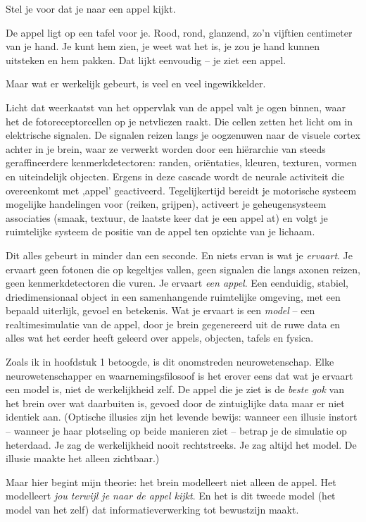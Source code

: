 \documentclass[11pt, twoside, openright]{book}
\begin{document}
Stel je voor dat je naar een appel kijkt.

De appel ligt op een tafel voor je. Rood, rond, glanzend, zo'n vijftien centimeter van je hand. Je kunt hem zien, je weet wat het is, je zou je hand kunnen uitsteken en hem pakken. Dat lijkt eenvoudig -- je ziet een appel.

Maar wat er werkelijk gebeurt, is veel en veel ingewikkelder.

Licht dat weerkaatst van het oppervlak van de appel valt je ogen binnen, waar het de fotoreceptorcellen op je netvliezen raakt. Die cellen zetten het licht om in elektrische signalen. De signalen reizen langs je oogzenuwen naar de visuele cortex achter in je brein, waar ze verwerkt worden door een hiërarchie van steeds geraffineerdere kenmerkdetectoren: randen, oriëntaties, kleuren, texturen, vormen en uiteindelijk objecten. Ergens in deze cascade wordt de neurale activiteit die overeenkomt met ‚appel' geactiveerd. Tegelijkertijd bereidt je motorische systeem mogelijke handelingen voor (reiken, grijpen), activeert je geheugensysteem associaties (smaak, textuur, de laatste keer dat je een appel at) en volgt je ruimtelijke systeem de positie van de appel ten opzichte van je lichaam.

Dit alles gebeurt in minder dan een seconde. En niets ervan is wat je \textit{ervaart}. Je ervaart geen fotonen die op kegeltjes vallen, geen signalen die langs axonen reizen, geen kenmerkdetectoren die vuren. Je ervaart \textit{een appel}. Een eenduidig, stabiel, driedimensionaal object in een samenhangende ruimtelijke omgeving, met een bepaald uiterlijk, gevoel en betekenis. Wat je ervaart is een \textit{model} -- een realtimesimulatie van de appel, door je brein gegenereerd uit de ruwe data en alles wat het eerder heeft geleerd over appels, objecten, tafels en fysica.

Zoals ik in hoofdstuk 1 betoogde, is dit onomstreden neurowetenschap. Elke neurowetenschapper en waarnemingsfilosoof is het erover eens dat wat je ervaart een model is, niet de werkelijkheid zelf. De appel die je ziet is de \textit{beste gok} van het brein over wat daarbuiten is, gevoed door de zintuiglijke data maar er niet identiek aan. (Optische illusies zijn het levende bewijs: wanneer een illusie instort -- wanneer je haar plotseling op beide manieren ziet -- betrap je de simulatie op heterdaad. Je zag de werkelijkheid nooit rechtstreeks. Je zag altijd het model. De illusie maakte het alleen zichtbaar.)

Maar hier begint mijn theorie: het brein modelleert niet alleen de appel. Het modelleert \textit{jou terwijl je naar de appel kijkt}. En het is dit tweede model (het model van het zelf) dat informatieverwerking tot bewustzijn maakt.
\end{document}

